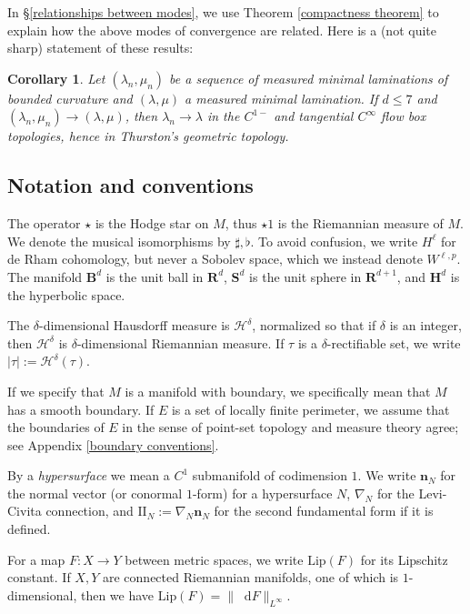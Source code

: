 \documentclass[reqno,11pt]{amsart}
\newcommand{\RR}{\mathbf{R}}
\newcommand{\Hyp}{\mathbf H}
\newcommand{\Sph}{\mathbf S}
\newcommand{\Ball}{\mathbf{B}}
\newcommand*\dif{\mathop{}\!\mathrm{d}}
\newcommand{\Two}{\mathrm{I\!I}}
\newcommand{\normal}{\mathbf n}
\newcommand{\Lip}{\mathrm{Lip}}
\newcommand{\dfn}[1]{\emph{#1}\index{#1}}
\newtheorem{corollary}[theorem]{Corollary}
\theoremstyle{definition}
\numberwithin{equation}{section}
\begin{document}
In \S\ref{relationships between modes}, we use Theorem \ref{compactness theorem} to explain how the above modes of convergence are related.
Here is a (not quite sharp) statement of these results:

\begin{corollary}
Let $(\lambda_n, \mu_n)$ be a sequence of measured minimal laminations of bounded curvature and $(\lambda, \mu)$ a measured minimal lamination.
If $d \leq 7$ and $(\lambda_n, \mu_n) \to (\lambda, \mu)$, then $\lambda_n \to \lambda$ in the $C^{1-}$ and tangential $C^\infty$ flow box topologies, hence in Thurston's geometric topology.
\end{corollary}


\subsection{Notation and conventions}
The operator $\star$ is the Hodge star on $M$, thus $\star 1$ is the Riemannian measure of $M$.
We denote the musical isomorphisms by $\sharp, \flat$.
To avoid confusion, we write $H^\ell$ for de Rham cohomology, but never a Sobolev space, which we instead denote $W^{\ell, p}$.
The manifold $\Ball^d$ is the unit ball in $\RR^d$, $\Sph^d$ is the unit sphere in $\RR^{d + 1}$, and $\Hyp^d$ is the hyperbolic space.

The $\delta$-dimensional Hausdorff measure is $\mathcal H^\delta$, normalized so that if $\delta$ is an integer, then $\mathcal H^\delta$ is $\delta$-dimensional Riemannian measure.
If $\tau$ is a $\delta$-rectifiable set, we write $|\tau| := \mathcal H^\delta(\tau)$.

If we specify that $M$ is a manifold with boundary, we specifically mean that $M$ has a smooth boundary.
If $E$ is a set of locally finite perimeter, we assume that the boundaries of $E$ in the sense of point-set topology and measure theory agree; see Appendix \ref{boundary conventions}.

By a \dfn{hypersurface} we mean a $C^1$ submanifold of codimension $1$.
We write $\normal_N$ for the normal vector (or conormal $1$-form) for a hypersurface $N$, $\nabla_N$ for the Levi-Civita connection, and $\Two_N := \nabla_N \normal_N$ for the second fundamental form if it is defined.

For a map $F: X \to Y$ between metric spaces, we write $\Lip(F)$ for its Lipschitz constant.
If $X, Y$ are connected Riemannian manifolds, one of which is $1$-dimensional, then we have $\Lip(F) = \|\dif F\|_{L^\infty}$.
\end{document}
